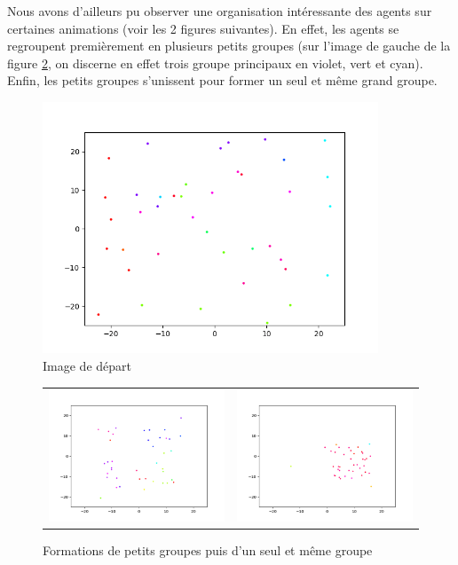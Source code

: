 \documentclass[french, a4paper, 12pt, openany]{report}
\begin{document}
   Nous avons d'ailleurs pu observer une organisation intéressante des agents sur certaines animations (voir les 2 figures suivantes). En effet, les agents se regroupent premièrement en plusieurs petits groupes (sur l'image de gauche de la figure \ref{mouvement_grp2}, on discerne en effet trois groupe principaux en violet, vert et cyan). Enfin, les petits groupes s'unissent pour former un seul et même grand groupe.
   
    \begin{figure}[!h]
		\centering
		\includegraphics[width=10cm]{images/image_8.png}
		\caption{Image de départ }
		\label{mouvement_grp}
	\end{figure} 
	
   \begin{figure}[!h]
		\centering
		\begin{tabular}{cc}
			\includegraphics[width=8cm]{images/image_7.png} & \includegraphics[width=8cm]{images/image_9.png} \\
		\end{tabular}
		\caption{Formations de petits groupes puis d'un seul et même groupe}
		\label{mouvement_grp2}
	\end{figure} 
	
\end{document}
